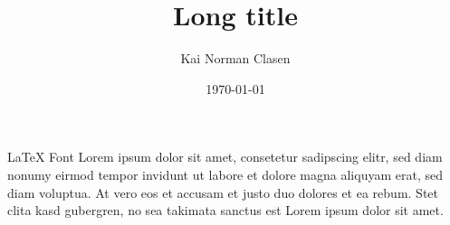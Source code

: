 \documentclass[aspectratio=169]{beamer}
\title[\LaTeX{} Font]{Long title}
\author{Kai Norman Clasen}
\institute{}
\date{\today}
\begin{document}
  \begin{frame}{\LaTeX{} Font}
    Lorem ipsum dolor sit amet, consetetur sadipscing elitr, 
    sed diam nonumy eirmod tempor invidunt ut labore et dolore 
    magna aliquyam erat, sed diam voluptua. 
    At vero eos et accusam et justo duo dolores et ea rebum. 
    Stet clita kasd gubergren, no sea takimata sanctus est 
    Lorem ipsum dolor sit amet. 
  \end{frame}
\end{document}
